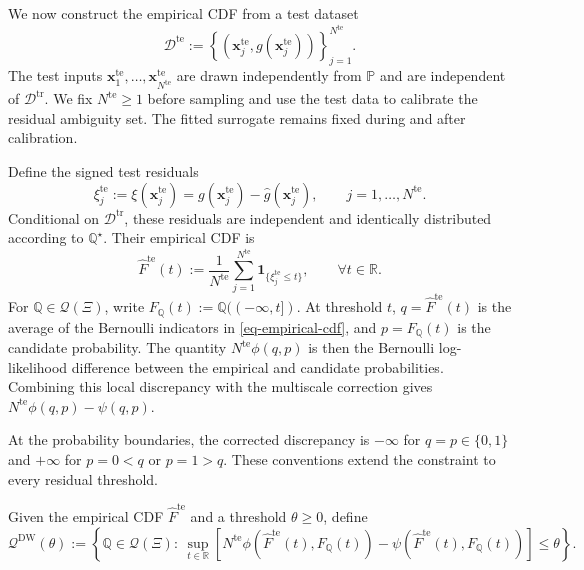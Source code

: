 \documentclass[review,11pt,3p,authoryear,nopreprintline]{elsarticle}
\begin{document}
We now construct the empirical CDF from a test dataset
\[
  \mathcal D^{\mathrm{te}}:=\left\{\left(\bm x_j^{\mathrm{te}},g(\bm x_j^{\mathrm{te}})\right)\right\}_{j=1}^{N^{\mathrm{te}}}.
\]
The test inputs $\bm x_1^{\mathrm{te}},\ldots,\bm x_{N^{\mathrm{te}}}^{\mathrm{te}}$ are drawn independently from $\mathbb P$ and are independent of $\mathcal D^{\mathrm{tr}}$. We fix $N^{\mathrm{te}}\ge1$ before sampling and use the test data to calibrate the residual ambiguity set. The fitted surrogate remains fixed during and after calibration.

Define the signed test residuals
\[
  \xi_j^{\mathrm{te}}:=\xi(\bm x_j^{\mathrm{te}})=g(\bm x_j^{\mathrm{te}})-\hat g(\bm x_j^{\mathrm{te}}),\qquad j=1,\ldots,N^{\mathrm{te}}.
\]
Conditional on $\mathcal D^{\mathrm{tr}}$, these residuals are independent and identically distributed according to $\mathbb Q^\star$. Their empirical CDF is
\begin{equation}
  \widehat F^{\mathrm{te}}(t):=\frac{1}{N^{\mathrm{te}}}\sum_{j=1}^{N^{\mathrm{te}}}\mathbf 1_{\{\xi_j^{\mathrm{te}}\le t\}},\qquad \forall t\in\mathbb R.
  \label{eq-empirical-cdf}
\end{equation}
For $\mathbb Q\in\mathcal Q(\Xi)$, write $F_{\mathbb Q}(t):=\mathbb Q(({-\infty},t])$. At threshold $t$, $q=\widehat F^{\mathrm{te}}(t)$ is the average of the Bernoulli indicators in \eqref{eq-empirical-cdf}, and $p=F_{\mathbb Q}(t)$ is the candidate probability. The quantity $N^{\mathrm{te}}\phi(q,p)$ is then the Bernoulli log-likelihood difference between the empirical and candidate probabilities. Combining this local discrepancy with the multiscale correction gives $N^{\mathrm{te}}\phi(q,p)-\psi(q,p)$.

At the probability boundaries, the corrected discrepancy is $-\infty$ for $q=p\in\{0,1\}$ and $+\infty$ for $p=0<q$ or $p=1>q$. These conventions extend the constraint to every residual threshold.

\begin{definition}
  \label{definition-dw-ambiguity-set}
  Given the empirical CDF $\widehat F^{\mathrm{te}}$ and a threshold $\theta\ge0$, define
  \begin{equation} 
    \label{eq-cdf-ambiguity-set}
      \mathscr Q^{\mathrm{DW}}(\theta):=\left\{\mathbb Q\in\mathcal Q(\Xi):\ 
      \sup_{t\in\mathbb R}\left[ N^{\mathrm{te}}\phi\!\left(\widehat F^{\mathrm{te}}(t),F_{\mathbb Q}(t)\right) 
       {}-\psi\!\left(\widehat F^{\mathrm{te}}(t),F_{\mathbb Q}(t)\right)\right]\le\theta\right\}. 
  \end{equation} 
\end{definition}
\end{document}
